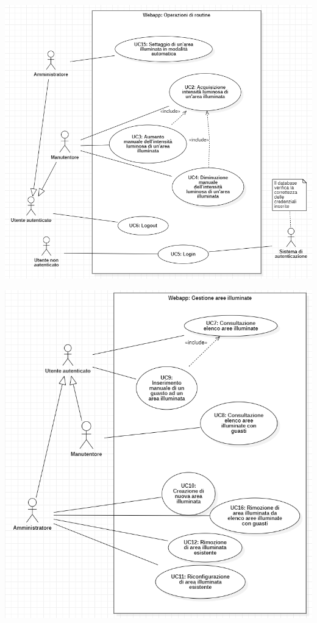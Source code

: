 \documentclass[a4paper, 12pt]{article}
\begin{document}
\includegraphics[scale=0.60]{diagramma_use_case_2.png}

\includegraphics[scale=0.7]{diagramma_use_case_3.png}
\end{document}
